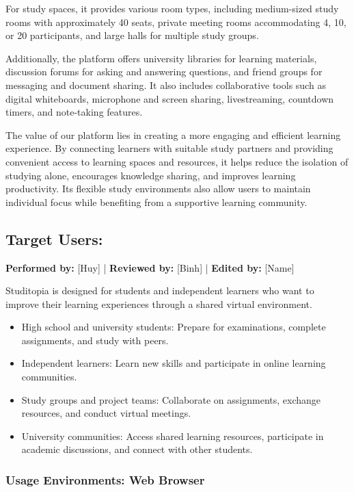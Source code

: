 \documentclass[12pt]{article}
\begin{document}
For study spaces, it provides various room types, including medium-sized study rooms with approximately 40 seats, private meeting rooms accommodating 4, 10, or 20 participants, and large halls for multiple study groups.

Additionally, the platform offers university libraries for learning materials, discussion forums for asking and answering questions, and friend groups for messaging and document sharing. It also includes collaborative tools such as digital whiteboards, microphone and screen sharing, livestreaming, countdown timers, and note-taking features.

The value of our platform lies in creating a more engaging and efficient learning experience. By connecting learners with suitable study partners and providing convenient access to learning spaces and resources, it helps reduce the isolation of studying alone, encourages knowledge sharing, and improves learning productivity. Its flexible study environments also allow users to maintain individual focus while benefiting from a supportive learning community.

\subsection{Target Users:}
\textbf{Performed by:} [Huy] | \textbf{Reviewed by:} [Binh] | \textbf{Edited by:} [Name]

Studitopia is designed for students and independent learners who want to improve their learning experiences through a shared virtual environment.
\begin{itemize}
    \item High school and university students: Prepare for examinations, complete assignments, and study with peers.
    \item Independent learners: Learn new skills and participate in online learning communities.
    \item Study groups and project teams: Collaborate on assignments, exchange resources, and conduct virtual meetings.
    \item University communities: Access shared learning resources, participate in academic discussions, and connect with other students.
\end{itemize}

\subsubsection{Usage Environments: Web Browser}
\end{document}
